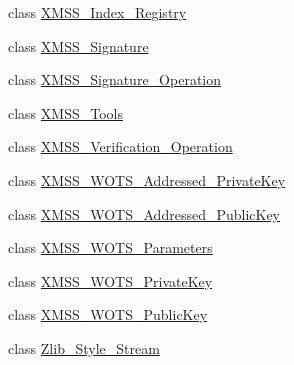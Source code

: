 \begin{DoxyCompactItemize}
\item 
class \mbox{\hyperlink{class_botan_1_1_x_m_s_s___index___registry}{X\+M\+S\+S\+\_\+\+Index\+\_\+\+Registry}}
\item 
class \mbox{\hyperlink{class_botan_1_1_x_m_s_s___signature}{X\+M\+S\+S\+\_\+\+Signature}}
\item 
class \mbox{\hyperlink{class_botan_1_1_x_m_s_s___signature___operation}{X\+M\+S\+S\+\_\+\+Signature\+\_\+\+Operation}}
\item 
class \mbox{\hyperlink{class_botan_1_1_x_m_s_s___tools}{X\+M\+S\+S\+\_\+\+Tools}}
\item 
class \mbox{\hyperlink{class_botan_1_1_x_m_s_s___verification___operation}{X\+M\+S\+S\+\_\+\+Verification\+\_\+\+Operation}}
\item 
class \mbox{\hyperlink{class_botan_1_1_x_m_s_s___w_o_t_s___addressed___private_key}{X\+M\+S\+S\+\_\+\+W\+O\+T\+S\+\_\+\+Addressed\+\_\+\+Private\+Key}}
\item 
class \mbox{\hyperlink{class_botan_1_1_x_m_s_s___w_o_t_s___addressed___public_key}{X\+M\+S\+S\+\_\+\+W\+O\+T\+S\+\_\+\+Addressed\+\_\+\+Public\+Key}}
\item 
class \mbox{\hyperlink{class_botan_1_1_x_m_s_s___w_o_t_s___parameters}{X\+M\+S\+S\+\_\+\+W\+O\+T\+S\+\_\+\+Parameters}}
\item 
class \mbox{\hyperlink{class_botan_1_1_x_m_s_s___w_o_t_s___private_key}{X\+M\+S\+S\+\_\+\+W\+O\+T\+S\+\_\+\+Private\+Key}}
\item 
class \mbox{\hyperlink{class_botan_1_1_x_m_s_s___w_o_t_s___public_key}{X\+M\+S\+S\+\_\+\+W\+O\+T\+S\+\_\+\+Public\+Key}}
\item 
class \mbox{\hyperlink{class_botan_1_1_zlib___style___stream}{Zlib\+\_\+\+Style\+\_\+\+Stream}}
\end{DoxyCompactItemize}
